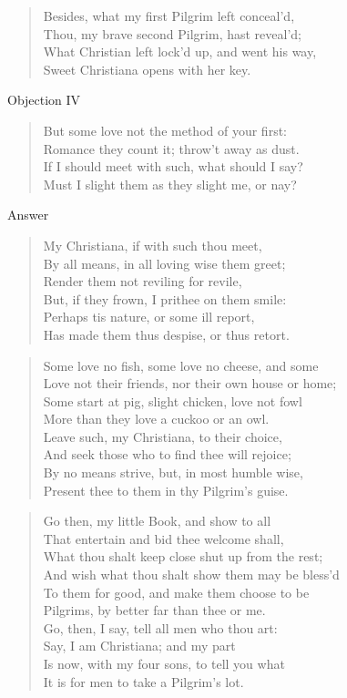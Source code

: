 \begin{verse}
Besides, what my first Pilgrim left conceal'd,\\
Thou, my brave second Pilgrim, hast reveal'd;\\
What Christian left lock'd up, and went his way,\\
Sweet Christiana opens with her key.\\
\end{verse}
Objection IV
\begin{verse}
But some love not the method of your first:\\
Romance they count it; throw't away as dust.\\
If I should meet with such, what should I say?\\
Must I slight them as they slight me, or nay?\\
\end{verse}
\newpage
Answer
\begin{verse}
My Christiana, if with such thou meet,\\
By all means, in all loving wise them greet;\\
Render them not reviling for revile,\\
But, if they frown, I prithee on them smile:\\
Perhaps tis nature, or some ill report,\\
Has made them thus despise, or thus retort.\\
\end{verse}
\begin{verse}
Some love no fish, some love no cheese, and some\\
Love not their friends, nor their own house or home;\\
Some start at pig, slight chicken, love not fowl\\
More than they love a cuckoo or an owl.\\
Leave such, my Christiana, to their choice,\\
And seek those who to find thee will rejoice;\\
By no means strive, but, in most humble wise,\\
Present thee to them in thy Pilgrim's guise.\\
\end{verse}
\begin{verse}
Go then, my little Book, and show to all\\
That entertain and bid thee welcome shall,\\
What thou shalt keep close shut up from the rest;\\
And wish what thou shalt show them may be bless'd\\
To them for good, and make them choose to be\\
Pilgrims, by better far than thee or me.\\
Go, then, I say, tell all men who thou art:\\
Say, I am Christiana; and my part\\
Is now, with my four sons, to tell you what\\
It is for men to take a Pilgrim's lot.\\
\end{verse}
